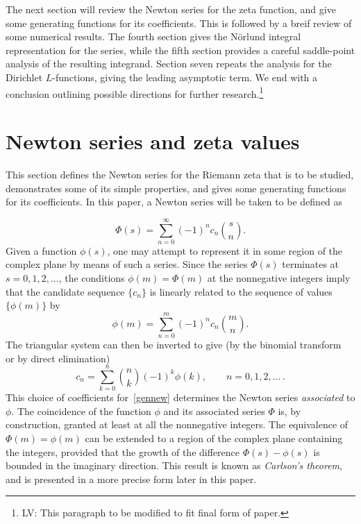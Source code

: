 \documentclass{amsart}
\begin{document}
The next section will review the Newton series for the zeta function,
and give some generating functions for its coefficients. This is followed
by a breif review of some numerical results. The fourth section
gives the N\"orlund integral representation for the series,
while the fifth section provides a careful saddle-point analysis 
of the resulting integrand.  Section seven repeats the analysis
for the Dirichlet $L$-functions, giving the leading asymptotic
term.  We end with a conclusion outlining possible directions
for further research.\footnote{%
  LV: This paragraph to be modified to fit final form of paper.}



\section{Newton series and zeta values}


This section defines the Newton series for the Riemann zeta
that is to be studied, demonstrates some of its simple properties,
and gives some generating functions for its coefficients.
In this paper, a Newton series will be taken to be defined as

\begin{equation}\label{gennew}
\Phi(s)=\sum_{n=0}^\infty (-1)^n c_n \binom{s}{n}.
\end{equation}
Given a function $\phi(s)$, one may attempt to represent it 
in some region of the complex plane by means of 
such a series. Since the series $\Phi(s)$ terminates at $s=0,1,2,\ldots$,
the conditions $\phi(m)=\Phi(m)$ at the nonnegative integers
imply that the candidate sequence $\{c_n\}$ is linearly related to the
sequence of values $\{\phi(m)\}$ by
\[
\phi(m)=\sum_{n=0}^m (-1)^n c_n \binom{m}{n}.
\]
The triangular system can then be inverted to 
give (by the binomial transform~\cite{GrKnPa89} or by direct elimination)
\begin{equation}\label{gencoeff}
c_n = \sum_{k=0}^{n} \binom{n}{k} (-1)^k \phi(k), \qquad n=0,1,2,\ldots\,.
\end{equation}
This choice of coefficients for~\eqref{gennew}
determines the Newton series \emph{associated} to $\phi$.
The coincidence of 
the function $\phi$ and its associated series
$\Phi$ is, by construction, granted at least
at all the nonnegative integers. The equivalence
of $\Phi(m)=\phi(m)$ can be extended to a region
of the complex plane containing the integers, provided that the
growth of the difference $\Phi(s)-\phi(s)$ is bounded in the imaginary
direction. This result is known as \emph{Carlson's theorem}, and is
presented in a more precise form later in this paper.
\end{document}
